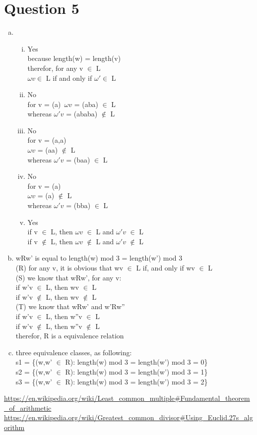\documentclass[11pt, a4paper]{article}
\begin{document}
\section*{Question 5}
\begin{enumerate}[(a)]
	\item 
	\begin{enumerate}[(i)]
		\item	Yes\\
		because length(w) = length(v)\\
		therefor, for any v $\in$ L\\
		$\omega v \in$ L if and only if $\omega ' \in$ L
		\item	No\\
		for v = (a)\
		$\omega v$ = (aba) $\in$ L\\
		whereas $\omega 'v$ = (ababa) $\notin$ L
		\item	No\\
		for v = (a,a)\\
		$\omega v$ = (aa) $\notin$ L\\
		whereas $\omega 'v$ = (baa) $\in$ L
		\item 	No\\
		for v = (a)\\
		$\omega v$ = (a) $\notin$ L\\
		whereas $\omega 'v$ = (bba) $\in$ L
		\item   Yes\\
		if v $\in$ L, then $\omega v$ $\in$ L and $\omega 'v$ $\in$ L\\
		if v $\notin$ L, then $\omega v$ $\notin$ L and $\omega 'v$ $\notin$ L
	\end{enumerate}
	\item
	wRw' is equal to length(w) mod 3 = length(w') mod 3\\
	(R) for any v, it is obvious that wv $\in$ L if, and only if wv $\in$ L\\
	(S) we know that wRw', for any v:\\
		if w'v $\in$ L, then wv $\in$ L\\
		if w'v $\notin$ L, then wv $\notin$ L\\
	(T) we know that wRw' and w'Rw''\\
		if w'v $\in$ L, then w''v $\in$ L\\
		if w'v $\notin$ L, then w''v $\notin$ L\\
	therefor, R is a equivalence relation
	\item three equivalence classes, as following:\\
		\lbrack s1 \rbrack = \{(w,w' $\in$ R): length(w) mod 3 = length(w') mod 3 = 0\}\\
		\lbrack s2 \rbrack = \{(w,w' $\in$ R): length(w) mod 3 = length(w') mod 3 = 1\}\\
		\lbrack s3 \rbrack = \{(w,w' $\in$ R): length(w) mod 3 = length(w') mod 3 = 2\}

\end{enumerate}

\begin{thebibliography}{99}
\url{https://en.wikipedia.org/wiki/Least_common_multiple#Fundamental_theorem_of_arithmetic} 
\bibitem{euclid}
\url{https://en.wikipedia.org/wiki/Greatest_common_divisor#Using_Euclid.27s_algorithm}
\end{thebibliography}
\end{document}
